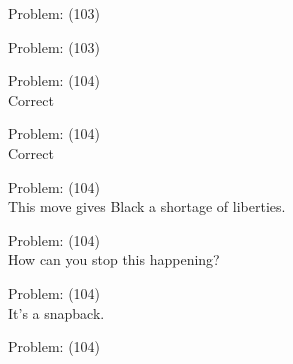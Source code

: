 \documentclass[11pt]{article}
\begin{document}
\begin{minipage}[t]{0.5\textwidth}
  {\centering
  
Problem: (103)\\
  }
\end{minipage}
\begin{minipage}[t]{0.5\textwidth}
  {\centering
  
Problem: (103)\\
  }
\end{minipage}
\begin{minipage}[t]{0.5\textwidth}
  {\centering
  
Problem: (104)\\
Correct\\
  }
\end{minipage}
\begin{minipage}[t]{0.5\textwidth}
  {\centering
  
Problem: (104)\\
Correct\\
  }
\end{minipage}
\begin{minipage}[t]{0.5\textwidth}
  {\centering
  
Problem: (104)\\
This move gives Black a shortage of liberties.\\
  }
\end{minipage}
\begin{minipage}[t]{0.5\textwidth}
  {\centering
  
Problem: (104)\\
How can you stop this happening?\\
  }
\end{minipage}
\begin{minipage}[t]{0.5\textwidth}
  {\centering
  
Problem: (104)\\
It's a snapback.\\
  }
\end{minipage}
\begin{minipage}[t]{0.5\textwidth}
  {\centering
  
Problem: (104)\\
  }
\end{minipage}
\end{document}
